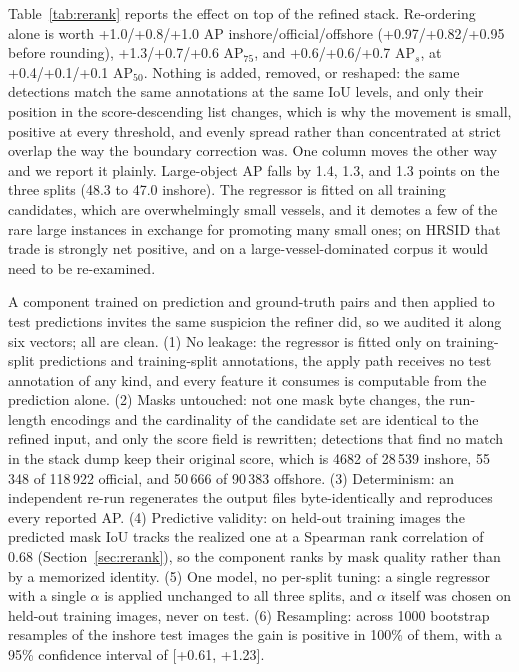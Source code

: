 Table~\ref{tab:rerank} reports the effect on top of the refined stack. Re-ordering alone is worth +1.0/+0.8/+1.0 AP inshore/official/offshore (+0.97/+0.82/+0.95 before rounding), +1.3/+0.7/+0.6 AP$_{75}$, and +0.6/+0.6/+0.7 AP$_s$, at +0.4/+0.1/+0.1 AP$_{50}$. Nothing is added, removed, or reshaped: the same detections match the same annotations at the same IoU levels, and only their position in the score-descending list changes, which is why the movement is small, positive at every threshold, and evenly spread rather than concentrated at strict overlap the way the boundary correction was. One column moves the other way and we report it plainly. Large-object AP falls by 1.4, 1.3, and 1.3 points on the three splits (48.3 to 47.0 inshore). The regressor is fitted on all training candidates, which are overwhelmingly small vessels, and it demotes a few of the rare large instances in exchange for promoting many small ones; on HRSID that trade is strongly net positive, and on a large-vessel-dominated corpus it would need to be re-examined.

A component trained on prediction and ground-truth pairs and then applied to test predictions invites the same suspicion the refiner did, so we audited it along six vectors; all are clean. (1) No leakage: the regressor is fitted only on training-split predictions and training-split annotations, the apply path receives no test annotation of any kind, and every feature it consumes is computable from the prediction alone. (2) Masks untouched: not one mask byte changes, the run-length encodings and the cardinality of the candidate set are identical to the refined input, and only the score field is rewritten; detections that find no match in the stack dump keep their original score, which is 4682 of 28\,539 inshore, 55\,348 of 118\,922 official, and 50\,666 of 90\,383 offshore. (3) Determinism: an independent re-run regenerates the output files byte-identically and reproduces every reported AP. (4) Predictive validity: on held-out training images the predicted mask IoU tracks the realized one at a Spearman rank correlation of 0.68 (Section~\ref{sec:rerank}), so the component ranks by mask quality rather than by a memorized identity. (5) One model, no per-split tuning: a single regressor with a single $\alpha$ is applied unchanged to all three splits, and $\alpha$ itself was chosen on held-out training images, never on test. (6) Resampling: across 1000 bootstrap resamples of the inshore test images the gain is positive in 100\% of them, with a 95\% confidence interval of [+0.61, +1.23].

